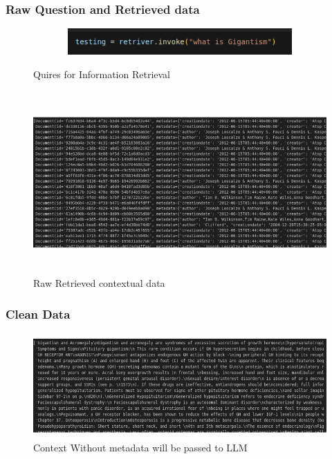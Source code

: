 \documentclass[12pt,a4paper]{report}
\begin{document}
\subsubsection{Raw Question and Retrieved data}
\begin{figure}[H]
    \centering
    \includegraphics[width=15cm, height=1cm]{RawQuestionAndRetrievedData}
    \caption{Quires for Information Retrieval}
    \label{fig:Raw Question and Retrieved data}

    \centering
    \includegraphics[width=15cm, height=7cm]{RawRetrievedContextualData}
    \caption{Raw Retrieved contextual data}
    \label{fig:Raw Retrieved contextual data}
\end{figure}


\subsubsection{Clean Data}
\begin{figure}[H]
    \centering
    \includegraphics[width=15cm, height=4cm]{CleanData}
    \caption{Context Without metadata will be passed to LLM}
    \label{fig:Clean Data}
\end{figure}
\end{document}
